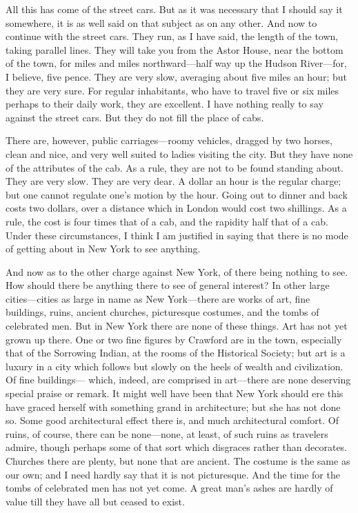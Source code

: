 All this has come of the street cars.  But as it was necessary that
I should say it somewhere, it is as well said on that subject as on
any other.  And now to continue with the street cars.  They run, as
I have said, the length of the town, taking parallel lines.  They
will take you from the Astor House, near the bottom of the town,
for miles and miles northward---half way up the Hudson River---for, I
believe, five pence.  They are very slow, averaging about five
miles an hour; but they are very sure.  For regular inhabitants,
who have to travel five or six miles perhaps to their daily work,
they are excellent.  I have nothing really to say against the
street cars.  But they do not fill the place of cabs.

There are, however, public carriages---roomy vehicles, dragged by
two horses, clean and nice, and very well suited to ladies visiting
the city.  But they have none of the attributes of the cab.  As a
rule, they are not to be found standing about.  They are very slow.
They are very dear.  A dollar an hour is the regular charge; but
one cannot regulate one's motion by the hour.  Going out to dinner
and back costs two dollars, over a distance which in London would
cost two shillings.  As a rule, the cost is four times that of a
cab, and the rapidity half that of a cab.  Under these
circumstances, I think I am justified in saying that there is no
mode of getting about in New York to see anything.

And now as to the other charge against New York, of there being
nothing to see.  How should there be anything there to see of
general interest?  In other large cities---cities as large in name
as New York---there are works of art, fine buildings, ruins, ancient
churches, picturesque costumes, and the tombs of celebrated men.
But in New York there are none of these things.  Art has not yet
grown up there.  One or two fine figures by Crawford are in the
town, especially that of the Sorrowing Indian, at the rooms of the
Historical Society; but art is a luxury in a city which follows but
slowly on the heels of wealth and civilization.  Of fine buildings---%
which, indeed, are comprised in art---there are none deserving
special praise or remark.  It might well have been that New York
should ere this have graced herself with something grand in
architecture; but she has not done so.  Some good architectural
effect there is, and much architectural comfort.  Of ruins, of
course, there can be none---none, at least, of such ruins as
travelers admire, though perhaps some of that sort which disgraces
rather than decorates.  Churches there are plenty, but none that
are ancient.  The costume is the same as our own; and I need hardly
say that it is not picturesque.  And the time for the tombs of
celebrated men has not yet come.  A great man's ashes are hardly of
value till they have all but ceased to exist.

